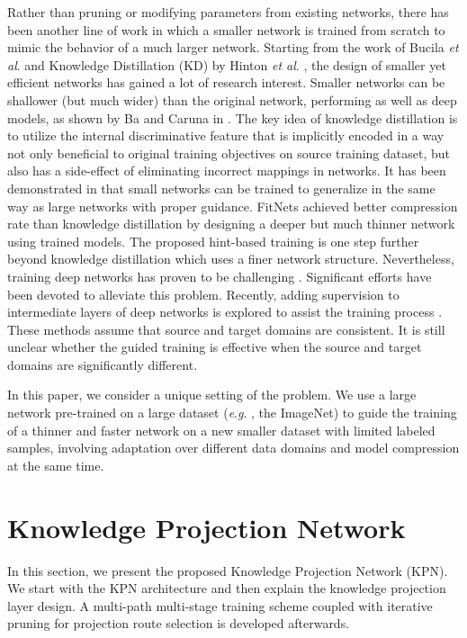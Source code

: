 \documentclass[journal]{IEEEtran}
\newcommand{\etal}{\textit{et al}. }
\newcommand{\eg}{\textit{e}.\textit{g}. }
\begin{document}
Rather than pruning or modifying parameters from existing networks, there has been another line of work in which a smaller network is trained from scratch to mimic the behavior of a much larger network. Starting from the work of Bucila \etal \cite{bucilua2006model} and  Knowledge Distillation (KD) by Hinton \etal \cite{hinton2015distilling}, the design of smaller yet efficient networks has gained a lot of research interest. Smaller networks can be shallower (but much wider) than the original network,  performing as well as deep models, as shown by Ba and Caruna in \cite{ba2014deep}. The key idea of knowledge distillation is to utilize the internal discriminative feature that is implicitly encoded in a way not only beneficial to original training objectives on source training dataset, but also has a side-effect of eliminating incorrect mappings in networks. It has been demonstrated in \cite{hinton2015distilling} that small networks can be trained to generalize in the same way as large networks with proper guidance. FitNets \cite{romero2014fitnets} achieved better compression rate than knowledge distillation by designing a deeper but much thinner network using trained models. The proposed hint-based training is one step further beyond knowledge distillation  which uses a finer network structure. Nevertheless, training deep networks has proven to be challenging \cite{erhan2009difficulty}. Significant efforts have been devoted to alleviate this problem. Recently, adding supervision to intermediate layers of deep networks is explored to assist the training process \cite{lee2015deeply, szegedy2015going}. These methods assume that source and target domains are consistent. It is still unclear whether the guided training is effective when 
the source and target domains are significantly different.

In this paper, we consider a unique setting of the problem. We use a  large network pre-trained on a large dataset (\eg, the ImageNet) to guide the training of a thinner and faster network on a new smaller dataset with limited labeled samples, involving  adaptation over different data domains and model compression at the same time. 

\section{Knowledge Projection Network}
\label{sec:kpn}

In this section, we present the proposed Knowledge Projection Network (KPN). We start with the KPN architecture and then explain the knowledge projection layer design. A multi-path multi-stage training scheme coupled with iterative pruning for projection route selection is developed afterwards.
\end{document}
